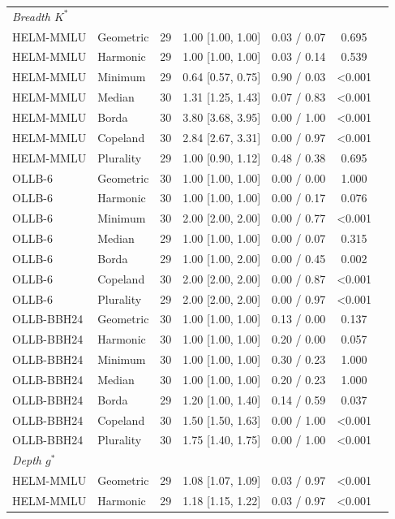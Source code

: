 \begin{tabular}{llrcccc}
\midrule
\multicolumn{6}{l}{\emph{Breadth $K^*$}}\\
HELM-MMLU & Geometric & 29 & 1.00 [1.00, 1.00] & 0.03 / 0.07 & 0.695\\
HELM-MMLU & Harmonic & 29 & 1.00 [1.00, 1.00] & 0.03 / 0.14 & 0.539\\
HELM-MMLU & Minimum & 29 & 0.64 [0.57, 0.75] & 0.90 / 0.03 & <0.001\\
HELM-MMLU & Median & 30 & 1.31 [1.25, 1.43] & 0.07 / 0.83 & <0.001\\
HELM-MMLU & Borda & 30 & 3.80 [3.68, 3.95] & 0.00 / 1.00 & <0.001\\
HELM-MMLU & Copeland & 30 & 2.84 [2.67, 3.31] & 0.00 / 0.97 & <0.001\\
HELM-MMLU & Plurality & 29 & 1.00 [0.90, 1.12] & 0.48 / 0.38 & 0.695\\
OLLB-6 & Geometric & 30 & 1.00 [1.00, 1.00] & 0.00 / 0.00 & 1.000\\
OLLB-6 & Harmonic & 30 & 1.00 [1.00, 1.00] & 0.00 / 0.17 & 0.076\\
OLLB-6 & Minimum & 30 & 2.00 [2.00, 2.00] & 0.00 / 0.77 & <0.001\\
OLLB-6 & Median & 29 & 1.00 [1.00, 1.00] & 0.00 / 0.07 & 0.315\\
OLLB-6 & Borda & 29 & 1.00 [1.00, 2.00] & 0.00 / 0.45 & 0.002\\
OLLB-6 & Copeland & 30 & 2.00 [2.00, 2.00] & 0.00 / 0.87 & <0.001\\
OLLB-6 & Plurality & 29 & 2.00 [2.00, 2.00] & 0.00 / 0.97 & <0.001\\
OLLB-BBH24 & Geometric & 30 & 1.00 [1.00, 1.00] & 0.13 / 0.00 & 0.137\\
OLLB-BBH24 & Harmonic & 30 & 1.00 [1.00, 1.00] & 0.20 / 0.00 & 0.057\\
OLLB-BBH24 & Minimum & 30 & 1.00 [1.00, 1.00] & 0.30 / 0.23 & 1.000\\
OLLB-BBH24 & Median & 30 & 1.00 [1.00, 1.00] & 0.20 / 0.23 & 1.000\\
OLLB-BBH24 & Borda & 29 & 1.20 [1.00, 1.40] & 0.14 / 0.59 & 0.037\\
OLLB-BBH24 & Copeland & 30 & 1.50 [1.50, 1.63] & 0.00 / 1.00 & <0.001\\
OLLB-BBH24 & Plurality & 30 & 1.75 [1.40, 1.75] & 0.00 / 1.00 & <0.001\\
\midrule
\multicolumn{6}{l}{\emph{Depth $g^*$}}\\
HELM-MMLU & Geometric & 29 & 1.08 [1.07, 1.09] & 0.03 / 0.97 & <0.001\\
HELM-MMLU & Harmonic & 29 & 1.18 [1.15, 1.22] & 0.03 / 0.97 & <0.001\\

\end{tabular}
